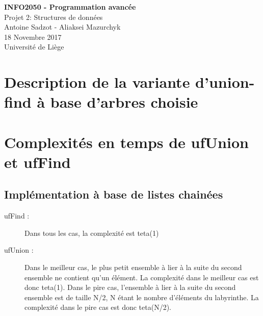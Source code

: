 \documentclass[11pt]{article}
\begin{document}
\begin{titlepage}

   \begin{figure}[htbp]
      \centering
   \end{figure}
  	
  	\hfill

	\begin{center}
		\vfill
		\textbf{
		\Huge{INFO2050 - Programmation avancée}}\\
		\bigskip
		\huge{Projet 2: Structures de données}\\
		\bigskip %
		\smallskip
		\Large{Antoine Sadzot - Aliaksei Mazurchyk} \\
		\bigskip
		\smallskip
		\large{18 Novembre 2017}\\%
		\vfill
		\large{Université de Liège}
	\end{center}
\end{titlepage}
\clearpage
\clearpage

\section{Description de la variante d'union-find à base d'arbres choisie}


\section{Complexités en temps de ufUnion et ufFind}

\subsection{Implémentation à base de listes chainées}

\begin{description}
\item[ufFind :] Dans tous les cas, la complexité est teta(1)
\item[ufUnion :] Dans le meilleur cas, le plus petit ensemble à lier à la suite du second ensemble ne contient qu'un élément. La complexité dans le meilleur cas est donc teta(1). Dans le pire cas, l'ensemble à lier à la suite du second ensemble est de taille N/2, N étant le nombre d'éléments du labyrinthe. La complexité dans le pire cas est donc teta(N/2).
\end{description}
\end{document}
